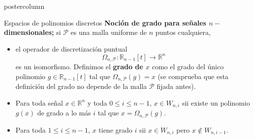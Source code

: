 \documentclass[final,hyperref={pdfpagelabels=false}]{beamer}
\newcommand{\IR}{\mathbb{R}}
\newcommand{\cali}[1]{\mathcal{#1}} %
\begin{document}
\begin{frame}
\begin{columns}
\begin{column}{.49\textwidth}
\begin{beamercolorbox}[center,wd=\textwidth]{postercolumn}
\begin{block}{Espacios de polinomios discretos}
			\textbf{Noci\'on de grado para se\~nales $n-$dimensionales;}
			si $\cali{P}$ es una malla uniforme de $n$ puntos cualquiera,  
			\begin{itemize}
			\item el operador de discretizaci\'on puntual
			\[
			\Omega_{n, \cali{P}}: \IR_{n-1}[t] \longrightarrow \IR^{n}
			\]
			es un isomorfismo. Definimos el \textbf{grado de $x$}
			como el grado del \'unico polinomio $g \in \IR_{n-1}[t]$
			tal que $\Omega_{n, \cali{P}} (g) = x$ (se comprueba que esta
			definici\'on del grado no depende de la malla $\cali{P}$ fijada antes).
			\item Para toda se\~nal $x \in \IR^{n}$ y toda $0 \leq i \leq n-1$,
			$x \in W_{n, i}$ sii existe un polinomio $g(x)$ de grado a lo 
			m\'as $i$ tal que $x = \Omega_{n, \cali{P}}(g)$.
			\item Para toda $1 \leq i \leq n-1$, $x$ tiene grado $i$
			sii $x \in W_{n,i}$ pero $x \not\in W_{n, i-1}$.
			\end{itemize}
				
			\end{block}		
			\vfill	
			\vspace{1cm}
			

			
			
			
			

\end{beamercolorbox}
\end{column}
\end{columns}
\end{frame}
\end{document}
